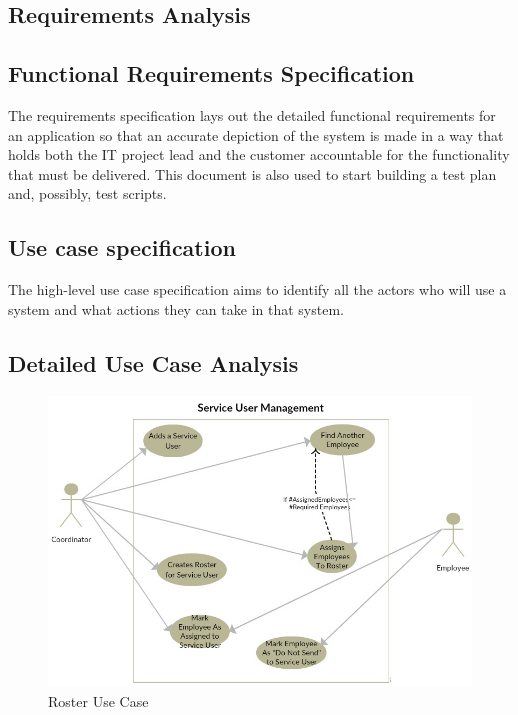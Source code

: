 \documentclass[a4paper,12pt]{article}
\begin{document}
\begin{samepage}
\section {Requirements Analysis}

\subsection {Functional Requirements Specification}

The requirements specification lays out the detailed functional requirements for an application so that an accurate depiction of the system is made in a way that holds both the IT project lead and the customer accountable for the functionality that must be delivered.  This document is also used to start building a test plan and, possibly, test scripts.

\subsection {Use case specification}
The high-level use case specification aims to identify all the actors who will use a system and what actions they can take in that system.


\subsection {Detailed Use Case Analysis}
 \begin{figure}[h!]
  \includegraphics[scale=0.8]{rosterusecase.jpg}
  \caption{Roster Use Case}
  \label{fig:roster use case}
\end{figure}


\end{samepage}
\end{document}
